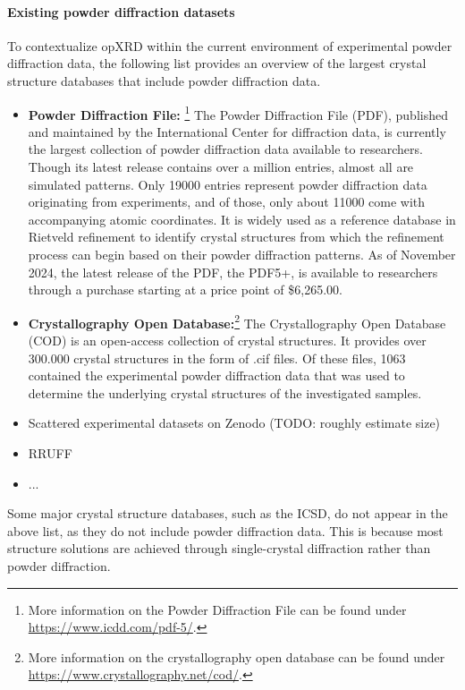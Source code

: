 

\paragraph{Existing powder diffraction datasets} To contextualize opXRD within the current environment of experimental powder diffraction data, the following list provides an overview of the largest crystal structure databases that include powder diffraction data. 

\begin{itemize}
\item \textbf{Powder Diffraction File:} \footnote{More information on the Powder Diffraction File can be found under \url{https://www.icdd.com/pdf-5/}.} The Powder Diffraction File (PDF), published and maintained by the International Center for diffraction data, is currently the largest collection of powder diffraction data available to researchers. Though its latest release contains over a million entries, almost all are simulated patterns. Only 19000 entries represent powder diffraction data originating from experiments, and of those, only about 11000 come with accompanying atomic coordinates. It is widely used as a reference database in Rietveld refinement to identify crystal structures from which the refinement process can begin based on their powder diffraction patterns. As of November 2024, the latest release of the PDF, the PDF5+, is available to researchers through a purchase starting at a price point of \$6,265.00.

\item \textbf{Crystallography Open Database:}\footnote{More information on the crystallography open database can be found under \url{https://www.crystallography.net/cod/}.} The Crystallography Open Database (COD) is an open-access collection of crystal structures. It provides over 300.000 crystal structures in the form of .cif files. Of these files, 1063 contained the experimental powder diffraction data that was used to determine the underlying crystal structures of the investigated samples. 

\item Scattered experimental datasets on Zenodo (TODO: roughly estimate size)
\item RRUFF
\item ...
\end{itemize}

Some major crystal structure databases, such as the ICSD, do not appear in the above list, as they do not include powder diffraction data. This is because most structure solutions are achieved through single-crystal diffraction rather than powder diffraction.
 
